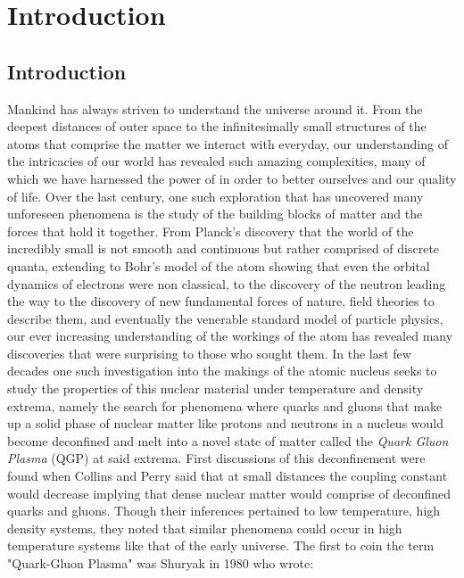 \chapter{Introduction}


\section{Introduction}
Mankind has always striven to understand the universe around it. From the deepest distances of outer space to the infinitesimally small structures of the atoms that comprise the matter we interact with everyday, our understanding of the intricacies of our world has revealed such amazing complexities, many of which we have harnessed the power of in order to better ourselves and our quality of life. Over the last century, one such exploration that has uncovered many unforeseen phenomena is the study of the building blocks of matter and the forces that hold it together. From Planck's discovery that the world of the incredibly small is not smooth and continuous but rather comprised of discrete quanta, extending to Bohr's model of the atom showing that even the orbital dynamics of electrons were non classical, to the discovery of the neutron leading the way to the discovery of new fundamental forces of nature, field theories to describe them, and eventually the venerable standard model of particle physics, our ever increasing understanding of the workings of the atom has revealed many discoveries that were surprising to those who sought them. In the last few decades one such investigation into the makings of the atomic nucleus seeks to study the properties of this nuclear material under temperature and density extrema, namely the search for phenomena where quarks and gluons that make up a solid phase of nuclear matter like protons and neutrons in a nucleus would become deconfined and melt into a novel state of matter called the \textit{Quark Gluon Plasma} (QGP) at said extrema. 
First discussions of this deconfinement were found when Collins and Perry \citep{Collins:1974ky} said that at small distances the coupling constant would decrease implying that dense nuclear matter would comprise of deconfined quarks and gluons. Though their inferences pertained to low temperature, high density systems, they noted that similar phenomena could occur in high temperature systems like that of the early universe. The first to coin the term "Quark-Gluon Plasma" was Shuryak in 1980 \citep{Shuryak:1980tp} who wrote: 

